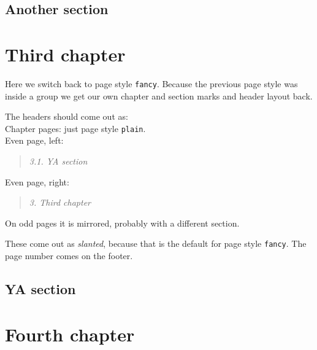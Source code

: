 \documentclass[openany]{book}
\begin{document}
\lipsum[1]

\section{Another section}

\lipsum

\newpage
\endgroup
\pagestyle{fancy}
\chapter{Third chapter}

\noindent
\begin{boxedminipage}{\textwidth}
Here we switch back to page style \texttt{fancy}. Because the previous page style was inside a group we get our own chapter and section marks and header layout back.

The headers should come out as:
\\
Chapter pages: just page style \texttt{plain}.
\\
Even page, left:
\begin{quote}
  \textsl{3.1. YA section}
\end{quote}
Even page, right:
\begin{quote}
  \textsl{3. Third chapter}
\end{quote}
On odd pages it is mirrored, probably with a different section.

These come out as \textsl{slanted}, because that is the default for page style \texttt{fancy}.
The page number comes on the footer.
\end{boxedminipage}
\bigskip

\lipsum[1]

\section{YA section}

\lipsum

\newpage
\pagestyle{myfancy}
\chapter{Fourth chapter}
\end{document}
